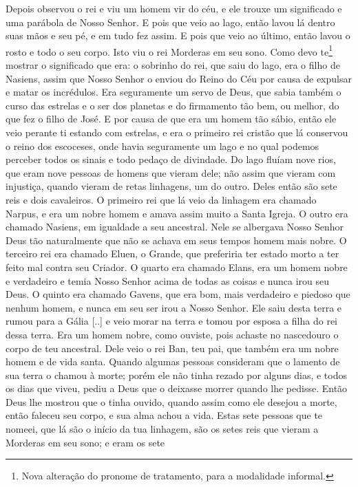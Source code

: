 Depois observou o rei e viu um homem vir do céu, e ele trouxe um significado
e uma parábola de Nosso Senhor. E pois que veio ao lago, então lavou lá dentro
suas mãos e seu pé,  e em tudo fez assim. E pois que veio ao último, então
lavou o rosto e todo o seu corpo. Isto viu o rei Morderas em seu sono. Como
devo te\footnote{ Nova alteração do pronome de tratamento, para a modalidade
informal.}  mostrar o significado que era: o sobrinho do rei, que
saiu do lago, era o filho de Nasiens, assim que Nosso Senhor o enviou do Reino
do Céu por causa de expulsar e matar os incrédulos. Era seguramente um servo de
Deus, que sabia também o curso das estrelas e o ser dos planetas e do
firmamento tão bem, ou melhor, do que fez o filho de José. E por causa de que
era um homem tão sábio, então ele veio perante ti estando com estrelas, e era o
primeiro rei cristão que lá conservou o reino dos escoceses, onde havia
seguramente um lago e no qual podemos perceber todos os sinais e todo pedaço de
divindade. Do lago fluíam nove rios, que eram nove pessoas de homens que vieram
dele; não assim que vieram com injustiça, quando vieram de retas linhagens, um
do outro. Deles então são sete reis e dois cavaleiros. O primeiro rei que lá
veio da linhagem era chamado Narpus, e era um nobre homem e amava assim muito a
Santa Igreja. O outro era chamado Nasiens, em igualdade a seu ancestral. Nele
se albergava Nosso Senhor Deus tão naturalmente que não se achava em seus
tempos homem mais nobre. O terceiro rei era chamado Eluen, o Grande, que
preferiria ter estado morto a ter feito mal contra seu Criador. O quarto era
chamado Elans, era um homem nobre e verdadeiro e temia Nosso Senhor acima de
todas as coisas e nunca irou seu Deus. O quinto era chamado Gavens, que era
bom, mais verdadeiro e piedoso que nenhum homem, e nunca em seu ser irou a
Nosso Senhor. Ele saiu desta terra e rumou para a Gália [..] e veio morar na
terra e tomou por esposa a filha do rei dessa terra. Era um homem nobre, como
ouviste, pois achaste no nascedouro o corpo de teu ancestral. Dele veio o rei
Ban, teu pai, que também era um nobre homem e de vida santa. Quando algumas
pessoas consideram que o lamento de sua terra o chamou à morte; porém ele não
tinha rezado por alguns dias, e todos os dias que viveu, pediu a Deus
que o deixasse morrer quando lhe pedisse. Então Deus lhe mostrou que o tinha
ouvido, quando assim como ele desejou a morte, então faleceu seu corpo, e sua
alma achou a vida. Estas sete pessoas que te nomeei, que lá são o início da tua
linhagem, são os setes reis que vieram a Morderas em seu sono; e eram os sete
